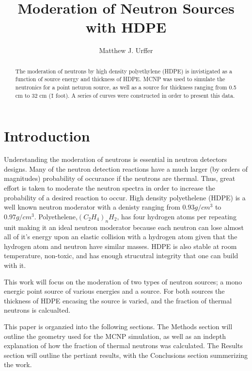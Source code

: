 \documentclass[draftcls,onecolumn]{IEEEtran}
\begin{document}
\title{Moderation of Neutron Sources with HDPE}
\author{Matthew J. Urffer}

\maketitle
\begin{abstract}
The moderation of neutrons by high density polyethylene (HDPE) is invistigated as a function of source energy and thickness of HDPE.
MCNP was used to simulate the neutronics for a point neturon source, as well as a  source for thickness ranging from 0.5 cm to 32 cm (\~ 1 foot).
A series of curves were constructed in order to present this data.
\end{abstract}

\IEEEpeerreviewmaketitle

\listoftodos
\pagebreak
\tableofcontents
\pagebreak
\listoffigures
\pagebreak
\listoftables
\pagebreak
\lstlistoflistings

\section{Introduction}
Understanding the moderation of neutrons is essential in neutron detectors designs.
Many of the neutron detection reactions have a much larger (by orders of magnitudes) probability of occurance if the neutrons are thermal.
Thus, great effort is taken to moderate the neutron spectra in order to increase the probability of a desired reaction to occur.
High density polyethelene (HDPE) is a well known neutron moderator with a denisty ranging from $0.93 g/cm^3$ to $0.97 g/cm^3$.
Polyethelene,$\left (C_2 H_4\right )_n H_2$, has four hydrogen atoms per repeating unit making it an ideal neutron moderator because each neutron can lose almost all of it's energy upon an elastic collision with a hydrogen atom given that the hydrogen atom and neutron have similar masses.
HDPE is also stable at room temperature, non-toxic, and has enough strucutral integrity that one can build with it.

This work will focus on the moderation of two types of neutron sources; a mono energic point source of various energies and a  source.
For both sources the thickness of HDPE encasing the source is varied, and the fraction of thermal neutrons is calcualted.


This paper is organzied into the following sections.  The Methods section will outline the geometry used for the MCNP simulation, as well as an indepth explanation of how the fraction of thermal neutrons was calculated.  The Results section will outline the pertiant results, with the Conclusions section summerizing the work.






\appendix
%
%
\end{document}
